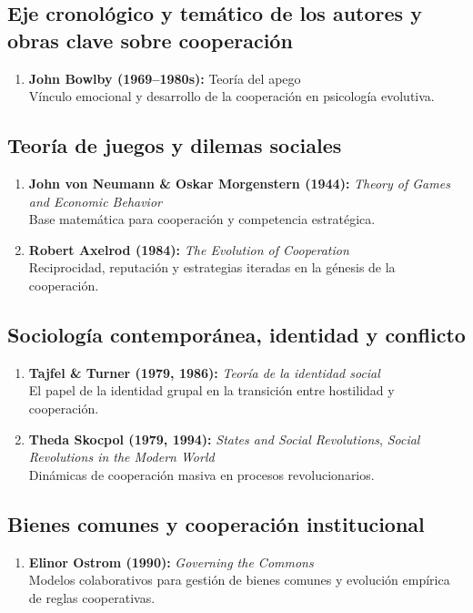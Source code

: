 \documentclass[a4paper,11pt]{article}
\begin{document}
\begin{seccionbox}[naranjasuave]{\section{Eje cronológico y temático de los autores y obras clave sobre cooperación}}
\begin{enumerate}
    \item \textbf{John Bowlby (1969–1980s):} Teoría del apego\\
    Vínculo emocional y desarrollo de la cooperación en psicología evolutiva.
\end{enumerate}

\subsection{Teoría de juegos y dilemas sociales}

\begin{enumerate}
    \item \textbf{John von Neumann \& Oskar Morgenstern (1944):} \textit{Theory of Games and Economic Behavior}\\
    Base matemática para cooperación y competencia estratégica.
    \item \textbf{Robert Axelrod (1984):} \textit{The Evolution of Cooperation}\\
    Reciprocidad, reputación y estrategias iteradas en la génesis de la cooperación.
\end{enumerate}

\subsection{Sociología contemporánea, identidad y conflicto}

\begin{enumerate}
    \item \textbf{Tajfel \& Turner (1979, 1986):} \textit{Teoría de la identidad social}\\
    El papel de la identidad grupal en la transición entre hostilidad y cooperación.
    \item \textbf{Theda Skocpol (1979, 1994):} \textit{States and Social Revolutions}, \textit{Social Revolutions in the Modern World}\\
    Dinámicas de cooperación masiva en procesos revolucionarios.
\end{enumerate}

\subsection{Bienes comunes y cooperación institucional}

\begin{enumerate}
    \item \textbf{Elinor Ostrom (1990):} \textit{Governing the Commons}\\
    Modelos colaborativos para gestión de bienes comunes y evolución empírica de reglas cooperativas.
\end{enumerate}


\end{seccionbox}
\end{document}
